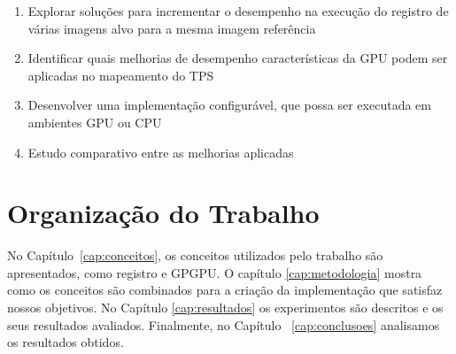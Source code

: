 \begin{enumerate}
	\item Explorar soluções para incrementar o desempenho na execução do registro
        de várias imagens alvo para a mesma imagem referência
	\item Identificar quais melhorias de desempenho características da GPU podem
        ser aplicadas no mapeamento do TPS
	\item Desenvolver uma implementação configurável, que possa ser executada
        em ambientes GPU ou CPU
  \item Estudo comparativo entre as melhorias aplicadas
\end{enumerate}

\section{Organização do Trabalho}
\label{sec:organizacao_trabalho}

No Capítulo~\ref{cap:conceitos}, os conceitos utilizados pelo trabalho
são apresentados, como registro e GPGPU. O capítulo \ref{cap:metodologia}
mostra como os conceitos são combinados para a criação da implementação que
satisfaz nossos objetivos. No Capítulo \ref{cap:resultados} os experimentos são
descritos e os seus resultados avaliados. Finalmente, no Capítulo
~\ref{cap:conclusoes} analisamos os resultados obtidos.
